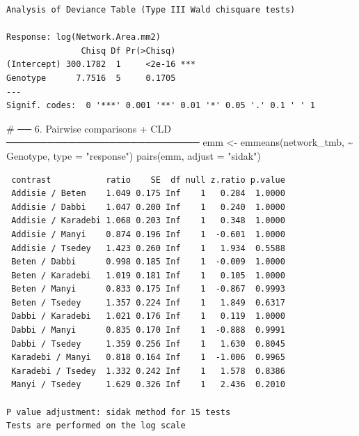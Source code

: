 \documentclass[
  letterpaper,
  DIV=11,
  numbers=noendperiod]{scrartcl}
\newenvironment{Shaded}{\begin{snugshade}}{\end{snugshade}}
\newcommand{\AttributeTok}[1]{\textcolor[rgb]{0.40,0.45,0.13}{#1}}
\newcommand{\CommentTok}[1]{\textcolor[rgb]{0.37,0.37,0.37}{#1}}
\newcommand{\FunctionTok}[1]{\textcolor[rgb]{0.28,0.35,0.67}{#1}}
\newcommand{\NormalTok}[1]{\textcolor[rgb]{0.00,0.23,0.31}{#1}}
\newcommand{\OtherTok}[1]{\textcolor[rgb]{0.00,0.23,0.31}{#1}}
\newcommand{\SpecialCharTok}[1]{\textcolor[rgb]{0.37,0.37,0.37}{#1}}
\newcommand{\StringTok}[1]{\textcolor[rgb]{0.13,0.47,0.30}{#1}}
\begin{document}
\begin{verbatim}
Analysis of Deviance Table (Type III Wald chisquare tests)

Response: log(Network.Area.mm2)
               Chisq Df Pr(>Chisq)    
(Intercept) 300.1782  1     <2e-16 ***
Genotype      7.7516  5     0.1705    
---
Signif. codes:  0 '***' 0.001 '**' 0.01 '*' 0.05 '.' 0.1 ' ' 1
\end{verbatim}

\begin{Shaded}
\begin{Highlighting}[]
\CommentTok{\# ── 6. Pairwise comparisons + CLD ────────────────────────────}
\NormalTok{emm }\OtherTok{\textless{}{-}} \FunctionTok{emmeans}\NormalTok{(network\_tmb, }\SpecialCharTok{\textasciitilde{}}\NormalTok{ Genotype, }\AttributeTok{type =} \StringTok{"response"}\NormalTok{)}
\FunctionTok{pairs}\NormalTok{(emm, }\AttributeTok{adjust =} \StringTok{"sidak"}\NormalTok{)}
\end{Highlighting}
\end{Shaded}

\begin{verbatim}
 contrast           ratio    SE  df null z.ratio p.value
 Addisie / Beten    1.049 0.175 Inf    1   0.284  1.0000
 Addisie / Dabbi    1.047 0.200 Inf    1   0.240  1.0000
 Addisie / Karadebi 1.068 0.203 Inf    1   0.348  1.0000
 Addisie / Manyi    0.874 0.196 Inf    1  -0.601  1.0000
 Addisie / Tsedey   1.423 0.260 Inf    1   1.934  0.5588
 Beten / Dabbi      0.998 0.185 Inf    1  -0.009  1.0000
 Beten / Karadebi   1.019 0.181 Inf    1   0.105  1.0000
 Beten / Manyi      0.833 0.175 Inf    1  -0.867  0.9993
 Beten / Tsedey     1.357 0.224 Inf    1   1.849  0.6317
 Dabbi / Karadebi   1.021 0.176 Inf    1   0.119  1.0000
 Dabbi / Manyi      0.835 0.170 Inf    1  -0.888  0.9991
 Dabbi / Tsedey     1.359 0.256 Inf    1   1.630  0.8045
 Karadebi / Manyi   0.818 0.164 Inf    1  -1.006  0.9965
 Karadebi / Tsedey  1.332 0.242 Inf    1   1.578  0.8386
 Manyi / Tsedey     1.629 0.326 Inf    1   2.436  0.2010

P value adjustment: sidak method for 15 tests 
Tests are performed on the log scale 
\end{verbatim}
\end{document}
